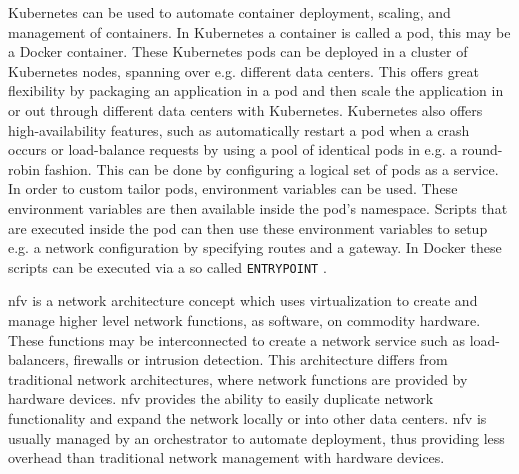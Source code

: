 Kubernetes \cite{kubernetes-website} can be used to automate container deployment, scaling, and management of containers. In Kubernetes a container is called a pod, this may be a Docker container. These Kubernetes pods can be deployed in a cluster of Kubernetes nodes, spanning over e.g. different data centers. This offers great flexibility by packaging an application in a pod and then scale the application in or out through different data centers with Kubernetes. Kubernetes also offers high-availability features, such as automatically restart a pod when a crash occurs or load-balance requests by using a pool of identical pods in e.g. a round-robin fashion. This can be done by configuring a logical set of pods as a service. In order to custom tailor pods, environment variables can be used. These environment variables are then available inside the pod's namespace. Scripts that are executed inside the pod can then use these environment variables to setup e.g. a network configuration by specifying routes and a gateway. In Docker these scripts can be executed via a so called \texttt{ENTRYPOINT} \cite{dockerfile-reference}.

\gls{nfv} is a network architecture concept which uses virtualization to create and manage higher level network functions, as software, on commodity hardware. These functions may be interconnected to create a network service such as load-balancers, firewalls or intrusion detection. This architecture differs from traditional network architectures, where network functions are provided by hardware devices. \gls{nfv} provides the ability to easily duplicate network functionality and expand the network locally or into other data centers. \gls{nfv} is usually managed by an orchestrator to automate deployment, thus providing less overhead than traditional network management with hardware devices.